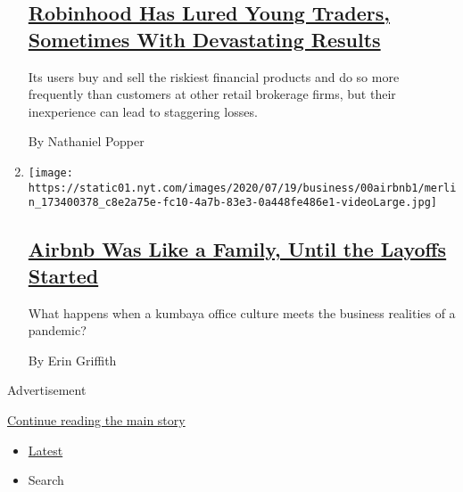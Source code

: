 \begin{enumerate}
{  \subsection{\texorpdfstring{\href{/2020/07/08/technology/robinhood-risky-trading.html}{Robinhood
  Has Lured Young Traders, Sometimes With Devastating
  Results}}{Robinhood Has Lured Young Traders, Sometimes With Devastating Results}}\label{robinhood-has-lured-young-traders-sometimes-with-devastating-results}}

  Its users buy and sell the riskiest financial products and do so more
  frequently than customers at other retail brokerage firms, but their
  inexperience can lead to staggering losses.

  By Nathaniel Popper
\item
  \texttt{[image: https://static01.nyt.com/images/2020/07/19/business/00airbnb1/merlin\_173400378\_c8e2a75e-fc10-4a7b-83e3-0a448fe486e1-videoLarge.jpg]}

  \hypertarget{airbnb-was-like-a-family-until-the-layoffs-started}{%
  \subsection{\texorpdfstring{\href{/2020/07/17/technology/airbnb-coronavirus-layoffs-.html}{Airbnb
  Was Like a Family, Until the Layoffs
  Started}}{Airbnb Was Like a Family, Until the Layoffs Started}}\label{airbnb-was-like-a-family-until-the-layoffs-started}}

  What happens when a kumbaya office culture meets the business
  realities of a pandemic?

  By Erin Griffith
\end{enumerate}

Advertisement

\protect\hyperlink{after-mid1}{Continue reading the main story}

\begin{itemize}
\tightlist
\item
  \protect\hyperlink{stream-panel}{Latest}
\item
  Search
\end{itemize}

